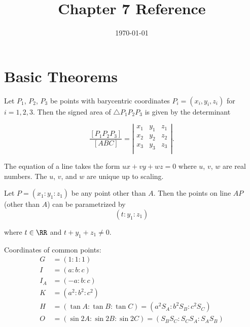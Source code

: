 \documentclass[11pt]{scrartcl}
\begin{document}
\title{Chapter 7 Reference}
\date{\today}
\maketitle

\section{Basic Theorems}
\begin{theorem}
  Let $P_1$, $P_2$, $P_3$ be points with barycentric coordinates $P_i = (x_i, y_i, z_i)$ for $i = 1, 2, 3$. Then the signed area of $\triangle P_1P_2P_3$ is given by the determinant

  \[\frac{\left[P_1P_2P_3\right]}{\left[ABC\right]}=
    \left\lvert
    \begin{array}{ccc}
      x_1 & y_1 & z_1 \\
      x_2 & y_2 & z_2 \\
      x_3 & y_3 & z_3 \\
    \end{array}
    \right\rvert.
  \]

\end{theorem}

\begin{theorem}
  The equation of a line takes the form $ux + vy + wz = 0$ where $u$, $v$, $w$ are real numbers. The $u$, $v$, and $w$ are unique up to scaling.
\end{theorem}

\begin{theorem}
  Let $P = (x_1 : y_1 : z_1)$ be any point other than $A$. Then the points on line $AP$ (other than $A$) can be parametrized by
  \[(t:y_1:z_1)\]

  \noindent
  where $t\in \RR$ and $t+y_1+z_1 \neq 0$.

\end{theorem}

Coordinates of common points:
\begin{align*}
  G &= (1:1:1)\\
  I &= (a:b:c)\\
  I_A &= (-a:b:c)\\
  K &= (a^2:b^2:c^2)\\
  H &= (\tan A:\tan B:\tan C) = (a^2S_A:b^2S_B:c^2S_C)\\
  O &= (\sin 2A:\sin 2B:\sin 2C)=(S_BS_C:S_CS_A:S_AS_B)\\
\end{align*}
\end{document}
